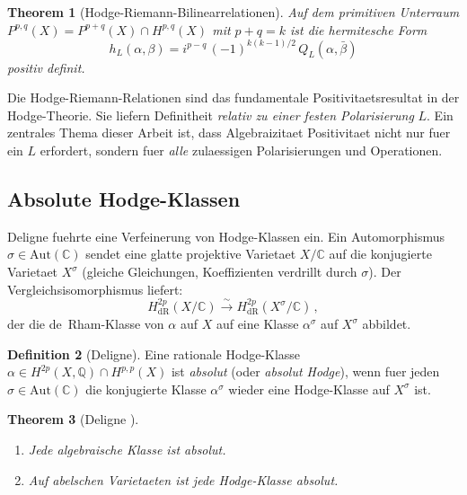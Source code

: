 \documentclass[aps,prd,twocolumn,superscriptaddress,nofootinbib]{revtex4-2}
\newtheorem{theorem}{Theorem}[section]
\theoremstyle{definition}
\newtheorem{definition}[theorem]{Definition}
\theoremstyle{remark}
\begin{document}
\begin{theorem}[Hodge-Riemann-Bilinearrelationen]
\label{thm:HR}
Auf dem primitiven Unterraum $P^{p,q}(X) = P^{p+q}(X) \cap H^{p,q}(X)$ mit $p + q = k$ ist die hermitesche Form
\begin{equation}
h_L(\alpha, \beta) = i^{p-q}\,(-1)^{k(k-1)/2}\, Q_L(\alpha, \bar{\beta})
\label{eq:HR_hermitian}
\end{equation}
positiv definit.
\end{theorem}

Die Hodge-Riemann-Relationen sind das fundamentale Positivitaetsresultat in der Hodge-Theorie. Sie liefern Definitheit \textit{relativ zu einer festen Polarisierung} $L$. Ein zentrales Thema dieser Arbeit ist, dass Algebraizitaet Positivitaet nicht nur fuer ein $L$ erfordert, sondern fuer \textit{alle} zulaessigen Polarisierungen und Operationen.

\subsection{Absolute Hodge-Klassen}

Deligne \cite{Deligne1982} fuehrte eine Verfeinerung von Hodge-Klassen ein. Ein Automorphismus $\sigma \in \mathrm{Aut}(\mathbb{C})$ sendet eine glatte projektive Varietaet $X/\mathbb{C}$ auf die konjugierte Varietaet $X^\sigma$ (gleiche Gleichungen, Koeffizienten verdrillt durch $\sigma$). Der Vergleichsisomorphismus liefert:
\begin{equation}
H^{2p}_{\mathrm{dR}}(X/\mathbb{C}) \xrightarrow{\sim} H^{2p}_{\mathrm{dR}}(X^\sigma/\mathbb{C})\,,
\end{equation}
der die de~Rham-Klasse von $\alpha$ auf $X$ auf eine Klasse $\alpha^\sigma$ auf $X^\sigma$ abbildet.

\begin{definition}[Deligne]
\label{def:absolute}
Eine rationale Hodge-Klasse $\alpha \in H^{2p}(X, \mathbb{Q}) \cap H^{p,p}(X)$ ist \textit{absolut} (oder \textit{absolut Hodge}), wenn fuer jeden $\sigma \in \mathrm{Aut}(\mathbb{C})$ die konjugierte Klasse $\alpha^\sigma$ wieder eine Hodge-Klasse auf $X^\sigma$ ist.
\end{definition}

\begin{theorem}[Deligne \cite{Deligne1982}]
\label{thm:deligne_absolute}
\begin{enumerate}
\item Jede algebraische Klasse ist absolut.
\item Auf abelschen Varietaeten ist jede Hodge-Klasse absolut.
\end{enumerate}
\end{theorem}
\end{document}

